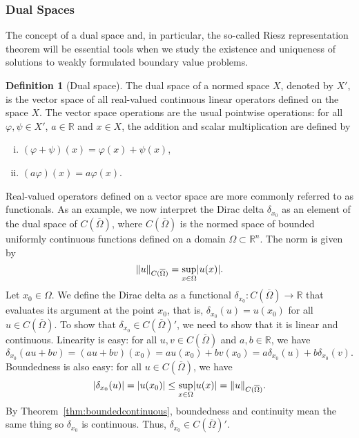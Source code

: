 \documentclass[english, 12pt, a4paper, sci, utf8, a-2b, online]{aaltothesis}
\theoremstyle{definition}
\newtheorem{definition}{Definition}[section]
\theoremstyle{plain}
\DeclarePairedDelimiter\abs{\lvert}{\rvert}
\DeclarePairedDelimiter\norm{\lVert}{\rVert}
\numberwithin{equation}{section}
\begin{document}
\subsubsection{Dual Spaces}
\label{subsubsec:dualspaces}

The concept of a dual space and, in particular, the so-called Riesz representation 
theorem will be essential tools
when we study the existence and uniqueness of solutions to
weakly formulated boundary value problems.
\begin{definition}[Dual space]
    \label{def:dualspace}
    The dual space of a normed space $X$, denoted by $X'$,
    is the vector space of all real-valued continuous linear operators defined on the space $X$. The vector space operations are the usual pointwise operations:
    for all $\varphi, \psi \in X'$, $a \in \mathbb{R}$ and $x \in X$,
    the addition and scalar multiplication are defined by
    \begin{enumerate}[(i)]
        \item $(\varphi + \psi)(x) = \varphi(x) + \psi(x)$,
        \item $(a \varphi)(x) = a \varphi(x)$.
    \end{enumerate}
\end{definition}
Real-valued operators defined on a vector space are more commonly referred to
as functionals. As an example, we now interpret the Dirac delta $\delta_{x_0}$ 
as an element of the dual space of $C(\overline{\Omega})$, where
$C(\overline{\Omega})$ is the normed space of bounded uniformly continuous
functions defined on a domain $\Omega \subset \mathbb{R}^n$.
The norm is given by
\begin{equation*}
    \norm{u}_{C(\overline{\Omega})} = \sup_{x \in \Omega} \abs{u(x)}.
\end{equation*}
Let $x_0 \in \Omega$. We define the Dirac delta as a functional
$\delta_{x_0}: C(\overline{\Omega}) \to \mathbb{R}$ that evaluates its argument
at the point $x_0$, that is, $\delta_{x_0}(u) = u(x_0)$ for all
$u \in C(\overline{\Omega})$.
To show that $\delta_{x_0} \in C(\overline{\Omega})'$,
we need to show that it is linear and continuous.
Linearity is easy: for all $u,v \in C(\overline{\Omega})$
and $a,b \in \mathbb{R}$, we have
\begin{equation*}
    \delta_{x_0}(au+bv)
    = (au+bv)(x_0)
    = au(x_0)+bv(x_0)
    = a \delta_{x_0}(u) + b \delta_{x_0}(v).
\end{equation*}
Boundedness is also easy: for all $u \in C(\overline{\Omega})$, we have
\begin{equation*}
    \abs{\delta_{x_0}(u)}
    = \abs{u(x_0)}
    \leq \sup_{x \in \Omega} \abs{u(x)}
    = \norm{u}_{C(\overline{\Omega})}.
\end{equation*}
By Theorem~\ref{thm:boundedcontinuous}, boundedness and continuity
mean the same thing so $\delta_{x_0}$ is continuous.
Thus, $\delta_{x_0} \in C(\overline{\Omega})'$.
\end{document}
